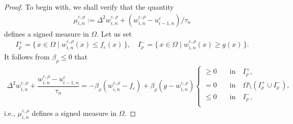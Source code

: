 \documentclass[12pt]{amsart}
\begin{document}
\begin{proof}
To begin with, we shall verify that the quantity 
\begin{align*}
\mu^{{\varepsilon},\rho}_{i,n}:= \Delta^2 w^{{\varepsilon},\rho}_{i,n} + (w^{{\varepsilon},\rho}_{i,n} - u^{\varepsilon}_{i-1,n})/\tau_n
\end{align*}
defines a signed measure in $\Omega$. Let us set 
\begin{align*}
I_{\rho}^{+} = \{\, x \in \Omega \mid w^{{\varepsilon},\rho}_{i,n}(x) \le f_{\varepsilon}(x) \,\}, \quad 
I_{\rho}^{-} = \{\, x \in \Omega \mid w^{{\varepsilon},\rho}_{i,n}(x) \ge g(x) \,\}. 
\end{align*}
It follows from ${\beta}_\rho \le 0$ that 
\begin{align*}
\Delta^2 w^{{\varepsilon},\rho}_{i,n} + \dfrac{w^{{\varepsilon},\rho}_{i,n} - u^{\varepsilon}_{i-1,n}}{\tau_n} 
 = -{\beta}_\rho(w^{{\varepsilon},\rho}_{i,n} - f_{\varepsilon}) + {\beta}_\rho(g - w^{{\varepsilon},\rho}_{i,n}) 
\begin{cases}
\ge 0 \quad & \text{in} \quad I_{\rho}^{+}, \\
= 0 \quad & \text{in} \quad \Omega \setminus (I_{\rho}^{+} \cup I_{\rho}^{-}), \\
\le 0 \quad & \text{in} \quad I_{\rho}^{-},  \\
\end{cases} 
\end{align*}
i.e., $\mu^{{\varepsilon},\rho}_{i,n}$ defines a signed measure in $\Omega$. 


\end{proof}
\end{document}
